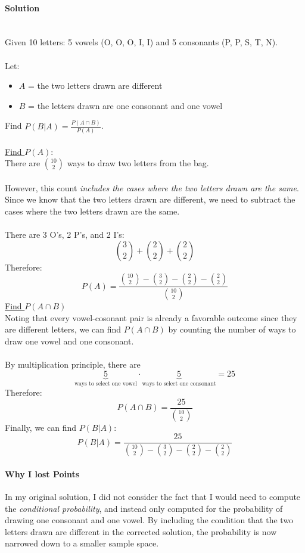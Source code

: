 ﻿\documentclass[12pt]{article}
\begin{document}
\begin{enumerate}[label=(\alph*), leftmargin=*]
\paragraph{Solution}\mbox{}\\
Given 10 letters: 5 vowels (O, O, O, I, I) and 5 consonants (P, P, S, T, N).\\\\
Let:
\begin{itemize}
    \item $A$ = the two letters drawn are different
    \item $B$ = the letters drawn are one consonant and one vowel
\end{itemize}
Find $P(B|A) = \frac{P(A\cap B)}{P(A)}$.\\\\
\underline{Find $P(A)$}:\\
There are $\binom{10}{2}$ ways to draw two letters from the bag.\\\\
However, this count \textit{includes the cases where the two letters drawn are the same}. Since we know that the two letters drawn are different, we need to subtract the cases where the two letters drawn are the same.\\\\
There are 3 O's, 2 P's, and 2 I's:
\[\binom{3}{2} + \binom{2}{2} + \binom{2}{2}\]
Therefore:
\[P(A) = \frac{\binom{10}{2}-\binom{3}{2}-\binom{2}{2}-\binom{2}{2}}{\binom{10}{2}}\]
\underline{Find $P(A\cap B)$}\\
Noting that every vowel-cosonant pair is already a favorable outcome since they are different letters, we can find $P(A\cap B)$ by counting the number of ways to draw one vowel and one consonant.\\\\
By multiplication principle, there are
\[\underbrace{5}_{\text{ways to select one vowel}}\cdot \underbrace{5}_{\text{ways to select one consonant}} = 25\]
Therefore:
\[P(A\cap B) = \frac{25}{\binom{10}{2}}\]
Finally, we can find $P(B|A)$:
\[\boxed{P(B|A)=\frac{25}{\binom{10}{2}-\binom{3}{2}-\binom{2}{2}-\binom{2}{2}}}\]
\end{enumerate}
\paragraph{Why I lost Points}\mbox{} In my original solution, I did not consider the fact that I would need to compute the \textit{conditional probability}, and instead only computed for the probability of drawing one consonant and one vowel. By including the condition that the two letters drawn are different in the corrected solution, the probability is now narrowed down to a smaller sample space.
\end{document}
